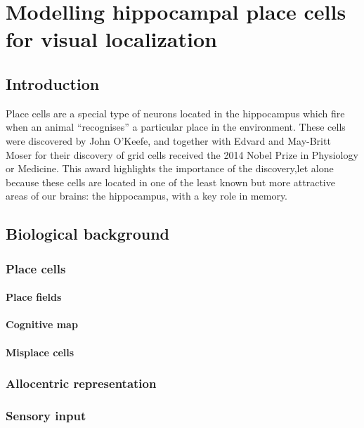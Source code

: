\chapter{Modelling hippocampal place cells for visual localization}\label{ch:chapter5} %


\section{Introduction}


Place cells are a special type of neurons located in the hippocampus which fire when an animal ``recognises'' a particular place in the environment. These cells were discovered by John O'Keefe, and together with Edvard and May-Britt Moser for their discovery of grid cells received the 2014 Nobel Prize in Physiology or Medicine. This award highlights the importance of the discovery,let alone because these cells are located in one of the least known but more attractive areas of our brains: the hippocampus, with a key role in memory.

\section{Biological background}

\subsection{Place cells}

\subsubsection{Place fields}

\subsubsection{Cognitive map}

\subsubsection{Misplace cells}

\subsection{Allocentric representation}

\subsection{Sensory input}

